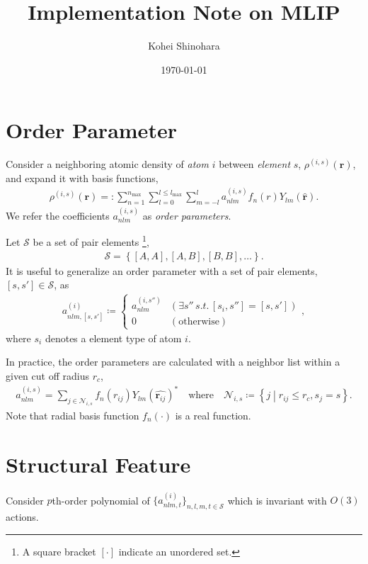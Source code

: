 \documentclass[a4paper, 11pt]{article}
\title{Implementation Note on MLIP}
\author{Kohei Shinohara}
\date{\today}
\theoremstyle{definition}
\newcommand{\term}[1]{\textit{#1}}
\newcommand{\relmiddle}[1]{\mathrel{}\middle#1\mathrel{}}
\newcommand{\set}[2]{\left\{ #1 \relmiddle| #2 \right\}}
\begin{document}
\maketitle

\section{Order Parameter}
Consider a neighboring atomic density of \term{atom} $i$ between \term{element} $s$, $\rho^{(i, s)}(\mathbf{r})$, and expand it with basis functions,
\begin{align}
  \rho^{(i, s)}(\mathbf{r})
    =: \sum_{n=1}^{n_{\mathrm{max}}} \sum_{l=0}^{l \leq l_{\mathrm{max}}} \sum_{m=-l}^{l} a^{(i, s)}_{nlm} f_{n}(r) Y_{lm}(\hat{\mathbf{r}}).
\end{align}
We refer the coefficients $a^{(i, s)}_{nlm}$ as \term{order parameters}.

Let $\mathcal{S}$ be a set of pair elements
\footnote{
  A square bracket $[ \cdot ]$ indicate an unordered set.
},
\begin{align}
  \mathcal{S} = \left\{ [A, A], [A, B], [B, B], \dots \right\}.
\end{align}
It is useful to generalize an order parameter with a set of pair elements, $[s, s'] \in \mathcal{S}$, as
\begin{align}
  a^{(i)}_{nlm, [s, s'] } \coloneqq
  \begin{cases}
    a^{(i, s'')}_{nlm} & (\exists s'' \,s.t.\, [s_{i}, s''] = [s, s'] ) \\
    0 & (\mathrm{otherwise})
  \end{cases},
\end{align}
where $s_{i}$ denotes a element type of atom $i$.

In practice, the order parameters are calculated with a neighbor list within a given cut off radius $r_{c}$,
\begin{align}
  a^{(i, s)}_{nlm} = \sum_{ j \in \mathcal{N}_{i,s} } f_{n}(r_{ij}) Y_{lm}(\hat{\mathbf{r}_{ij}})^{\ast}
  \quad \mbox{where} \quad
  \mathcal{N}_{i, s} \coloneqq \set{j}{ r_{ij} \leq r_{c}, s_{j} = s }.
\end{align}
Note that radial basis function $f_{n}(\cdot)$ is a real function.

\section{Structural Feature}
Consider $p$th-order polynomial of $\{ a^{(i)}_{nlm, t}\}_{n, l, m, t \in \mathcal{S}}$ which is invariant with $O(3)$ actions.
\end{document}
